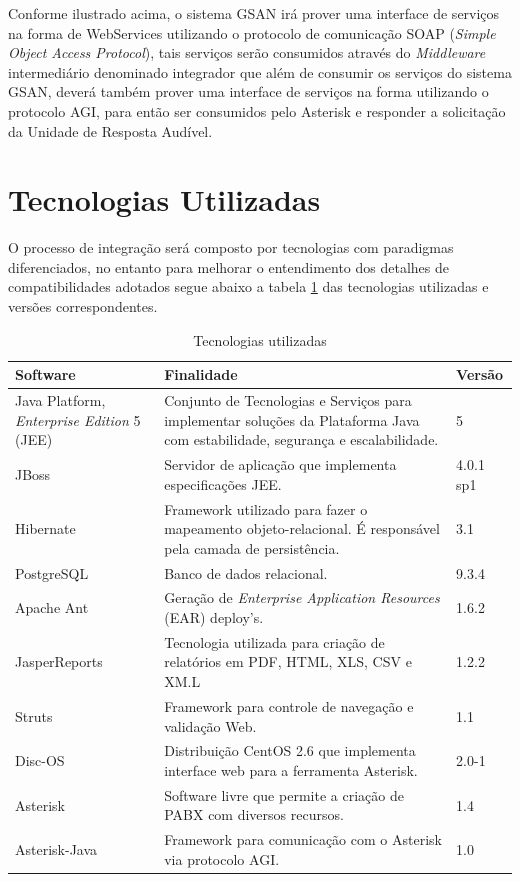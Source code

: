 Conforme ilustrado acima, o sistema GSAN irá prover uma interface de serviços na forma de WebServices utilizando o protocolo de comunicação SOAP (\textit{Simple Object Access Protocol}), tais serviços serão consumidos através do \textit{Middleware} intermediário denominado integrador que além de consumir os serviços do sistema GSAN, deverá também prover uma interface de serviços na forma utilizando o protocolo AGI, para então ser consumidos pelo Asterisk e responder a solicitação da Unidade de Resposta Audível.


\section{Tecnologias Utilizadas}
O processo de integração será composto por tecnologias com paradigmas diferenciados, no entanto para melhorar o entendimento dos detalhes de compatibilidades adotados segue abaixo a tabela \ref{tabela:tecnologiasUtilizadas}
	 das tecnologias utilizadas e versões correspondentes.


\begin{table}[H]
	\center
	\footnotesize
	\caption{Tecnologias utilizadas}
	\label{tabela:tecnologiasUtilizadas}
	\begin{tabular}{|p{4cm}|p{7cm}|p{2cm}|}
		\hline
		\textbf{Software} & \textbf{Finalidade} & \textbf{Versão} \\
		\hline
		Java Platform, \textit{Enterprise Edition} 5 (JEE) & Conjunto de Tecnologias e Serviços para implementar soluções da Plataforma Java com estabilidade, segurança e escalabilidade. & 5 \\
		\hline
		JBoss 				& Servidor de aplicação que implementa especificações JEE. 								& 4.0.1 sp1 \\
		\hline
		Hibernate 			& Framework utilizado para fazer o mapeamento objeto-relacional. É responsável pela camada de persistência. & 3.1 \\
		\hline
		PostgreSQL 			& Banco de dados relacional. 															& 9.3.4 \\
		\hline
		Apache Ant 			& Geração de \textit{Enterprise Application Resources} (EAR) deploy’s. 					& 1.6.2 \\
		\hline
		JasperReports 		& Tecnologia utilizada para criação de relatórios em PDF, HTML, XLS, CSV e XM.L 		& 1.2.2 \\
		\hline
		Struts 				& Framework para controle de navegação e validação Web. 								& 1.1	 \\
		\hline
		Disc-OS 			& Distribuição CentOS 2.6 que implementa interface web para a ferramenta Asterisk. 		& 2.0-1 \\
		\hline
		Asterisk 			& Software livre que permite a criação de PABX com diversos recursos. 					& 1.4 \\		
		\hline
		Asterisk-Java 		& Framework para comunicação com o Asterisk via protocolo AGI. 							& 1.0 \\	
		\hline			
	\end{tabular}
\end{table}



